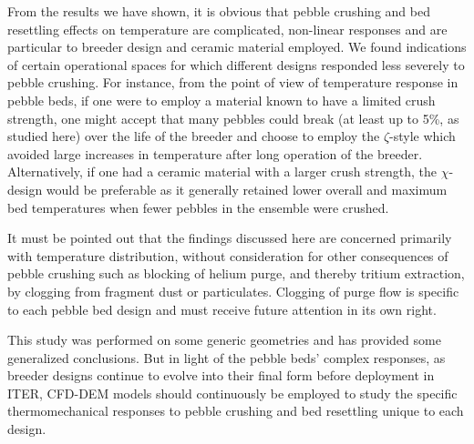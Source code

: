 From the results we have shown, it is obvious that pebble crushing and bed resettling effects on temperature are complicated, non-linear responses and are particular to breeder design and ceramic material employed. We found indications of certain operational spaces for which different designs responded less severely to pebble crushing. For instance, from the point of view of temperature response in pebble beds, if one were to employ a material known to have a limited crush strength, one might accept that many pebbles could break (at least up to 5\%, as studied here) over the life of the breeder and choose to employ the $\zeta$-style which avoided large increases in temperature after long operation of the breeder. Alternatively, if one had a ceramic material with a larger crush strength, the $\chi$-design would be preferable as it generally retained lower overall and maximum bed temperatures when fewer pebbles in the ensemble were crushed.

It must be pointed out that the findings discussed here are concerned primarily with temperature distribution, without consideration for other consequences of pebble crushing such as blocking of helium purge, and thereby tritium extraction, by clogging from fragment dust or particulates. Clogging of purge flow is specific to each pebble bed design and must receive future attention in its own right.

This study was performed on some generic geometries and has provided some generalized conclusions. But in light of the pebble beds' complex responses, as breeder designs continue to evolve into their final form before deployment in ITER, CFD-DEM models should continuously be employed to study the specific thermomechanical responses to pebble crushing and bed resettling unique to each design.









